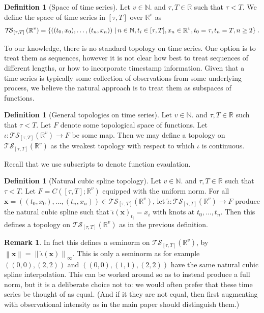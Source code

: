 \documentclass{article}
\theoremstyle{plain}
\theoremstyle{definition}
\newtheorem{definition}[thm]{Definition}
\newtheorem{remark}[thm]{Remark}
\newcommand{\ts}[2]{\mathcal{T\!S}_{#1}\left(#2\right)}
\newcommand{\norm}[1]{\left\|#1\right\|}
\newcommand{\reals}{\mathbb{R}}
\newcommand{\naturals}{\mathbb{N}}
\newcommand{\set}[2]{\left\{{#1}\,\left\vert\,{#2}\vphantom{{#1}}\right\}\right.}
\begin{document}
	\begin{definition}[Space of time series]
	Let $v \in \naturals$. and $\tau, T \in \reals$ such that $\tau < T$. We define the space of time series in $[\tau, T]$ over $\reals^v$ as
	\begin{equation*}
	\ts{[\tau, T]}{\reals^v} = \set{((t_0, x_0), \ldots, (t_n, x_n))}{n \in \naturals, t_i \in [\tau, T], x_n \in \reals^v, t_0 = \tau, t_n = T, n \geq 2}.
	\end{equation*}
	\end{definition}
	
	To our knowledge, there is no standard topology on time series. One option is to treat them as sequences, however it is not clear how best to treat sequences of different lengths, or how to incorporate timestamp information. Given that a time series is typically some collection of observations from some underlying process, we believe the natural approach is to treat them as subspaces of functions.

	\begin{definition}[General topologies on time series]	
	Let $v \in \naturals$. and $\tau, T \in \reals$ such that $\tau < T$. Let $F$ denote some topological space of functions. Let $\iota \colon \ts{[\tau, T]}{\reals^v} \to F$ be some map. Then we may define a topology on $\ts{[\tau, T]}{\reals^v}$ as the weakest topology with respect to which $\iota$ is continuous.
	\end{definition}

	Recall that we use subscripts to denote function evaulation.
	
	\begin{definition}[Natural cubic spline topology]
	Let $v \in \naturals$. and $\tau, T \in \reals$ such that $\tau < T$. Let $F = C([\tau, T]; \reals^v)$ equipped with the uniform norm. For all $\mathbf{x} = ((t_0, x_0), \ldots, (t_n, x_n)) \in \ts{[\tau, T]}{\reals^v}$, let $\widehat{\iota} \colon \ts{[\tau, T]}{\reals^v} \to F$ produce the natural cubic spline such that $\widehat{\iota}(\mathbf{x})_{t_i} = x_i$ with knots at $t_0, \ldots, t_n$. Then this defines a topology on $\ts{[\tau, T]}{\reals^v}$ as in the previous definition.
	\end{definition}
	
	\begin{remark}
	In fact this defines a seminorm on $\ts{[\tau, T]}{\reals^v}$, by $\norm{\mathbf{x}} = \norm{\widehat{\iota}(\mathbf{x})}_\infty$. This is only a seminorm as for example $((0, 0), (2, 2))$ and $((0, 0), (1, 1), (2, 2))$ have the same natural cubic spline interpolation. This can be worked around so as to instead produce a full norm, but it is a deliberate choice not to: we would often prefer that these time series be thought of as equal. (And if it they are not equal, then first augmenting with observational intensity as in the main paper should distinguish them.)
	\end{remark}
	
\end{document}
